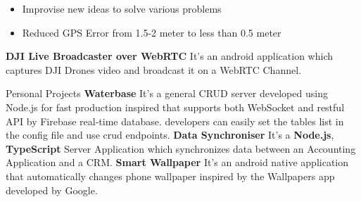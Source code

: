\begin{cventries}
{\begin{itemize}
            \item Improvise new ideas to solve various problems
            \item Reduced GPS Error from 1.5-2 meter to less than 0.5 meter
        \end{itemize}
        \textcolor{primary}{\textbf{DJI Live Broadcaster over WebRTC}}\break
        {It's an android application which captures DJI Drones video and broadcast it on a WebRTC Channel.}\break
        \break
    }   
  \cventry
    {} %
    {Personal Projects} %
    {} %
    {} %
    {
        \textcolor{primary}{\textbf{Waterbase}}\break
        {It's a general CRUD server developed using Node.js for fast production inspired that supports both WebSocket and restful API by Firebase real-time database. developers can easily set the tables list in the config file and use crud endpoints.}\break
        \break
        \textcolor{primary}{\textbf{Data Synchroniser}}\break
        {It's a \textbf{Node.js}, \textbf{TypeScript} Server Application which synchronizes data between an Accounting Application and a CRM.}\break
        \break
        \textcolor{primary}{\textbf{Smart Wallpaper}}\break
        {It's an android native application that automatically changes phone wallpaper inspired by the Wallpapers app developed by Google.}\break
    }
\end{cventries}
